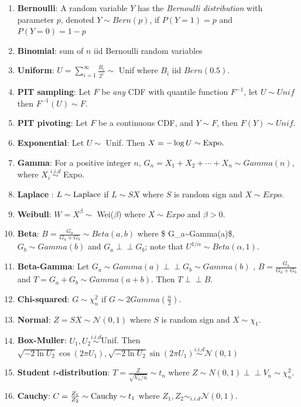 \documentclass[
  letterpaper,
  DIV=11,
  numbers=noendperiod]{scrreprt}
\theoremstyle{definition}
\theoremstyle{plain}
\theoremstyle{remark}
\begin{document}
\begin{enumerate}
\def\labelenumi{\arabic{enumi}.}
\item
  \textbf{Bernoulli}: A random variable \(Y\) has the \emph{Bernoulli
  distribution} with parameter \(p\), denoted \(Y\sim Bern(p)\), if
  \(P(Y=1)=p\) and \(P(Y=0)=1-p\)
\item
  \textbf{Binomial}: sum of \(n\) iid Bernoulli random variables
\item
  \textbf{Uniform}: \(U = \sum_{i=1}^\infty \frac{B_i}{2^i} \sim\) Unif
  where \(B_i\) iid \(Bern(0.5)\).
\item
  \textbf{PIT sampling}: Let \(F\) be \textit{any} CDF with quantile
  function \(F^{-1}\), let \(U \sim Unif\) then \(F^{-1}(U) \sim F.\)
\item
  \textbf{PIT pivoting}: Let \(F\) be a continuous CDF, and
  \(Y \sim F\), then \(F(Y)\sim Unif.\)
\item
  \textbf{Exponential}: Let \(U\sim\) Unif. Then
  \(X = -\log U \sim \textnormal{Expo}.\)
\item
  \textbf{Gamma}: For a positive integer \(n\),
  \(G_n= X_1+X_2+\cdots + X_n \sim Gamma(n)\), where
  \(X_i \overset{i.i.d}{\sim}\) Expo.
\item
  \textbf{Laplace} : \(L \sim \textnormal{Laplace}\) if \(L \sim SX\)
  where \(S\) is random sign and \(X\sim Expo.\)
\item
  \textbf{Weibull}: \(W = X^\beta \sim\) Wei(\(\beta\)) where
  \(X \sim Expo\) and \(\beta >0.\)
\item
  \textbf{Beta}: \(B = \frac{G_a}{G_a+G_b} \sim Beta(a,b)\) where \$
  G\_a\sim Gamma(a)\$, \(G_b\sim Gamma(b)\) and
  \(G_a \perp\!\!\!\!\perp G_b\); note that
  \(U^{1/\alpha} \sim Beta(\alpha,1).\)
\item
  \textbf{Beta-Gamma}: Let
  \(G_a \sim Gamma(a) \perp\!\!\!\!\perp G_b\sim Gamma(b)\) ,
  \(B = \frac{G_a}{G_a+G_b}\) and \(T = G_a + G_b \sim Gamma(a+b).\)
  Then \(T \perp\!\!\!\!\perp B.\)
\item
  \textbf{Chi-squared}: \(G \sim \chi_n^2\) if
  \(G\sim 2Gamma\left(\frac{n}{2}\right).\)
\item
  \textbf{Normal}: \(Z = SX \sim \mathcal{N}(0,1)\) where \(S\) is
  random sign and \(X\sim \chi_1.\)
\item
  \textbf{Box-Muller}: \(U_1,U_2 \overset{i.i.d}{\sim}\)Unif. Then
  \(\sqrt{-2\ln U_2}\cos{(2\pi U_1)}, \sqrt{-2\ln U_2}\sin{(2\pi U_1)} \overset{i.i.d}{\sim} \mathcal{N}(0,1)\)
\item
  \textbf{Student \(t\)-distribution}:
  \(T = \frac{Z}{\sqrt{V_n/n}} \sim t_n\) where
  \(Z \sim N(0,1) \perp\!\!\!\!\perp V_n \sim \chi_n^2.\)
\item
  \textbf{Cauchy}:
  \(C = \frac{Z_1}{Z_2} \sim \textnormal{Cauchy} \sim t_1\) where
  \(Z_1,Z_2 \sim_{i.i.d} \mathcal{N}(0,1)\).
\end{enumerate}
\end{document}
